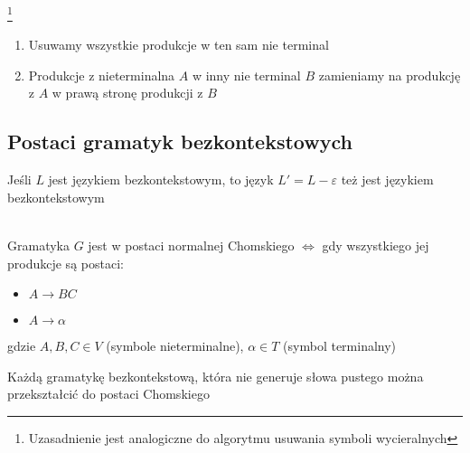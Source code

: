 	\begin{alg}\footnote{Uzasadnienie jest analogiczne do algorytmu usuwania symboli wycieralnych}~\\
		\begin{enumerate}
			\item Usuwamy wszystkie produkcje w ten sam nie terminal
			\item Produkcje z nieterminalna $A$ w inny nie terminal $B$ zamieniamy na produkcję z $A$ w prawą stronę produkcji z $B$
		\end{enumerate}
	\end{alg}
	
\subsection{Postaci gramatyk bezkontekstowych}

	\begin{tw}
		Jeśli $L$ jest językiem bezkontekstowym, to język $L' = L - \varepsilon$ też jest językiem bezkontekstowym
	\end{tw}
	
	\begin{df}~\\
		Gramatyka $G$ jest w postaci normalnej Chomskiego $\Leftrightarrow$ gdy wszystkiego jej produkcje są postaci:
		\begin{itemize}
			\item $A\rightarrow BC$
			\item $A \rightarrow \alpha$
		\end{itemize}
		gdzie $A,B,C \in V$ (symbole nieterminalne), $\alpha \in T$ (symbol terminalny)
	\end{df}
	
	\begin{lemat}
		Każdą gramatykę bezkontekstową, która nie generuje słowa pustego można przekształcić do postaci Chomskiego
	\end{lemat}
	
